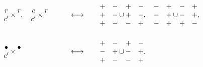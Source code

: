 \documentclass[11pt ,reqno]{amsart}
\begin{document}
\begin{alignat}{2}
\label{3.2.6b}\\
\noalign{\bigskip}
&\begin{matrix} r\\ c'\end{matrix}\times \begin{matrix} r\\ \ \end{matrix},\quad \begin{matrix}
c\\ c'\end{matrix}\times \begin{matrix} r\\ \ \end{matrix} 
&&\qquad\longleftrightarrow\qquad 
\begin{matrix} +&-\\ +&-\\ +&-\end{matrix}\cup \begin{matrix} +&-\\+&-\\ -&+\end{matrix},\quad
\begin{matrix} -&+\\ -&+\\ -&+\end{matrix}\cup \begin{matrix} -&+\\ -&+\\ +&-\end{matrix},
\label{3.2.6c}\\ 
\noalign{\bigskip}
&\begin{matrix} \bullet\\ c'\end{matrix}\times \begin{matrix}\bullet\\ \ \end{matrix}
&&\qquad\longleftrightarrow\qquad 
\begin{matrix} +&-\\ -&+\\ +&-\end{matrix}\cup \begin{matrix} +&-\\ -&+\\ -&+\end{matrix}.
\label{3.2.6d}
\end{alignat}
\end{document}
